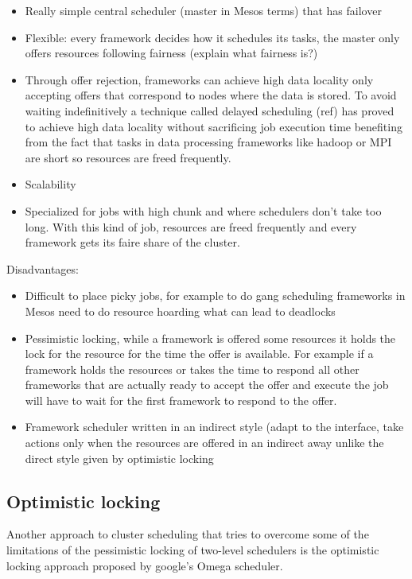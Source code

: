 \documentclass{svjour3}                     %
\begin{document}
\begin{itemize}
  \item
  Really simple central scheduler (master in Mesos terms) that has
  failover 
 \item
  Flexible: every framework decides how it schedules its tasks, the
  master only offers resources following fairness (explain what fairness is?)
 \item
  Through offer rejection, frameworks can achieve high data locality
  only accepting offers that correspond to nodes where the data is
  stored. To avoid waiting indefinitively a technique called delayed
  scheduling (ref) has proved to achieve high data locality without
  sacrificing job execution time benefiting from the fact that tasks in
  data processing frameworks like hadoop or MPI are short so resources
  are freed frequently.
 \item Scalability
 \item Specialized for jobs with high chunk and where schedulers don't take
too long. With this kind of job, resources are freed frequently and
every framework gets its faire share of the cluster.
\end{itemize}

Disadvantages:

\begin{itemize}
 \item Difficult to place picky jobs, for example to do gang scheduling
frameworks in Mesos need to do resource hoarding what can lead to
deadlocks
 \item Pessimistic locking, while a framework is offered some resources it
holds the lock for the resource for the time the offer is
available. For example if a framework holds the resources or takes the
time to respond all other frameworks that are actually ready to accept
the offer and execute the job will have to wait for the first
framework to respond to the offer.
 \item Framework scheduler written in an indirect style (adapt to the interface, 
  take actions only when the resources are offered in an indirect away unlike
  the direct style given by optimistic locking
\end{itemize}

\subsection{Optimistic locking}

Another approach to cluster scheduling that tries to overcome some of
the limitations of the pessimistic locking of two-level schedulers is
the optimistic locking approach proposed by google's Omega
scheduler.
\end{document}
